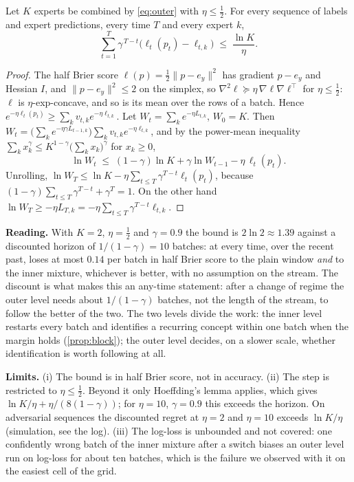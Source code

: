 \begin{proposition}\label{prop:outer}
Let $K$ experts be combined by \cref{eq:outer} with $\eta\le\tfrac12$. For every sequence of labels and expert
predictions, every time $T$ and every expert $k$,
\[
  \sum_{t=1}^{T}\gamma^{\,T-t}\bigl(\ell_t(p_t)-\ell_{t,k}\bigr)\;\le\;\frac{\ln K}{\eta}.
\]
\end{proposition}
\begin{proof}
The half Brier score $\ell(p)=\tfrac12\lVert p-e_y\rVert^2$ has gradient $p-e_y$ and Hessian $I$, and
$\lVert p-e_y\rVert^2\le2$ on the simplex, so $\nabla^2\ell\succeq\eta\,\nabla\ell\nabla\ell^{\top}$ for
$\eta\le\tfrac12$: $\ell$ is $\eta$-exp-concave, and so is its mean over the rows of a batch. Hence
$e^{-\eta\ell_t(p_t)}\ge\sum_kv_{t,k}e^{-\eta\ell_{t,k}}$. Let $W_t=\sum_ke^{-\eta L_{t,k}}$, $W_0=K$. Then
$W_t=\bigl(\sum_ke^{-\eta\gamma L_{t-1,k}}\bigr)\sum_kv_{t,k}e^{-\eta\ell_{t,k}}$, and by the power-mean inequality
$\sum_kx_k^{\gamma}\le K^{1-\gamma}\bigl(\sum_kx_k\bigr)^{\gamma}$ for $x_k\ge0$,
\[
  \ln W_t\;\le\;(1-\gamma)\ln K+\gamma\ln W_{t-1}-\eta\,\ell_t(p_t).
\]
Unrolling, $\ln W_T\le\ln K-\eta\sum_{t\le T}\gamma^{T-t}\ell_t(p_t)$, because
$(1-\gamma)\sum_{t\le T}\gamma^{T-t}+\gamma^{T}=1$. On the other hand
$\ln W_T\ge-\eta L_{T,k}=-\eta\sum_{t\le T}\gamma^{T-t}\ell_{t,k}$.
\end{proof}

\textbf{Reading.} With $K=2$, $\eta=\tfrac12$ and $\gamma=0.9$ the bound is $2\ln2\approx1.39$ against a discounted
horizon of $1/(1-\gamma)=10$ batches: at every time, over the recent past, \method{} loses at most $0.14$ per batch
in half Brier score to the plain window \emph{and} to the inner mixture, whichever is better, with no assumption on
the stream. The discount is what makes this an any-time statement: after a change of regime the outer level needs
about $1/(1-\gamma)$ batches, not the length of the stream, to follow the better of the two. The two levels divide
the work: the inner level restarts every batch and identifies a recurring concept within one batch when the margin
holds (\cref{prop:block}); the outer level decides, on a slower scale, whether identification is worth following
at all.

\textbf{Limits.} (i) The bound is in half Brier score, not in accuracy. (ii) The step is restricted to
$\eta\le\tfrac12$. Beyond it only Hoeffding's lemma applies, which gives $\ln K/\eta+\eta/(8(1-\gamma))$; for
$\eta=10$, $\gamma=0.9$ this exceeds the horizon. On adversarial sequences the discounted regret at $\eta=2$ and
$\eta=10$ exceeds $\ln K/\eta$ (simulation, see the log). (iii) The log-loss is unbounded and not covered: one
confidently wrong batch of the inner mixture after a switch biases an outer level run on log-loss for about ten
batches, which is the failure we observed with it on the easiest cell of the grid.

